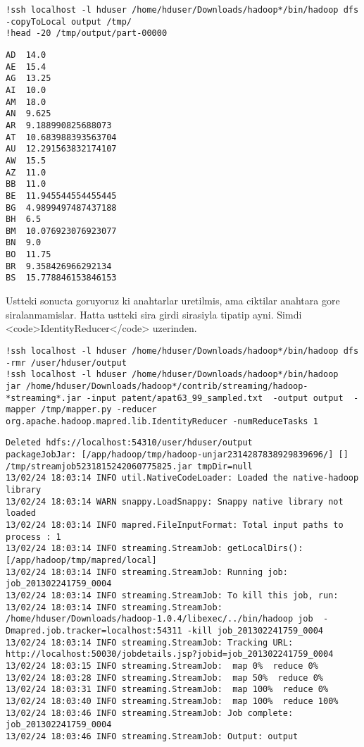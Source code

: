 \documentclass[12pt,fleqn]{article}\usepackage{../common}
\begin{document}
\begin{verbatim}
!ssh localhost -l hduser /home/hduser/Downloads/hadoop*/bin/hadoop dfs  -copyToLocal output /tmp/
!head -20 /tmp/output/part-00000
\end{verbatim}

\begin{verbatim}
AD	14.0
AE	15.4
AG	13.25
AI	10.0
AM	18.0
AN	9.625
AR	9.188990825688073
AT	10.683988393563704
AU	12.291563832174107
AW	15.5
AZ	11.0
BB	11.0
BE	11.945544554455445
BG	4.9899497487437188
BH	6.5
BM	10.076923076923077
BN	9.0
BO	11.75
BR	9.358426966292134
BS	15.778846153846153
\end{verbatim}

Ustteki sonucta goruyoruz ki anahtarlar uretilmis, ama ciktilar
anahtara gore siralanmamislar. Hatta ustteki sira girdi sirasiyla
tipatip ayni. Simdi <code>IdentityReducer</code> uzerinden.

\begin{verbatim}
!ssh localhost -l hduser /home/hduser/Downloads/hadoop*/bin/hadoop dfs -rmr /user/hduser/output
!ssh localhost -l hduser /home/hduser/Downloads/hadoop*/bin/hadoop  jar /home/hduser/Downloads/hadoop*/contrib/streaming/hadoop-*streaming*.jar -input patent/apat63_99_sampled.txt  -output output  -mapper /tmp/mapper.py -reducer org.apache.hadoop.mapred.lib.IdentityReducer -numReduceTasks 1 
\end{verbatim}

\begin{verbatim}
Deleted hdfs://localhost:54310/user/hduser/output
packageJobJar: [/app/hadoop/tmp/hadoop-unjar2314287838929839696/] [] /tmp/streamjob5231815242060775825.jar tmpDir=null
13/02/24 18:03:14 INFO util.NativeCodeLoader: Loaded the native-hadoop library
13/02/24 18:03:14 WARN snappy.LoadSnappy: Snappy native library not loaded
13/02/24 18:03:14 INFO mapred.FileInputFormat: Total input paths to process : 1
13/02/24 18:03:14 INFO streaming.StreamJob: getLocalDirs(): [/app/hadoop/tmp/mapred/local]
13/02/24 18:03:14 INFO streaming.StreamJob: Running job: job_201302241759_0004
13/02/24 18:03:14 INFO streaming.StreamJob: To kill this job, run:
13/02/24 18:03:14 INFO streaming.StreamJob: /home/hduser/Downloads/hadoop-1.0.4/libexec/../bin/hadoop job  -Dmapred.job.tracker=localhost:54311 -kill job_201302241759_0004
13/02/24 18:03:14 INFO streaming.StreamJob: Tracking URL: http://localhost:50030/jobdetails.jsp?jobid=job_201302241759_0004
13/02/24 18:03:15 INFO streaming.StreamJob:  map 0%  reduce 0%
13/02/24 18:03:28 INFO streaming.StreamJob:  map 50%  reduce 0%
13/02/24 18:03:31 INFO streaming.StreamJob:  map 100%  reduce 0%
13/02/24 18:03:40 INFO streaming.StreamJob:  map 100%  reduce 100%
13/02/24 18:03:46 INFO streaming.StreamJob: Job complete: job_201302241759_0004
13/02/24 18:03:46 INFO streaming.StreamJob: Output: output
\end{verbatim}
\end{document}
